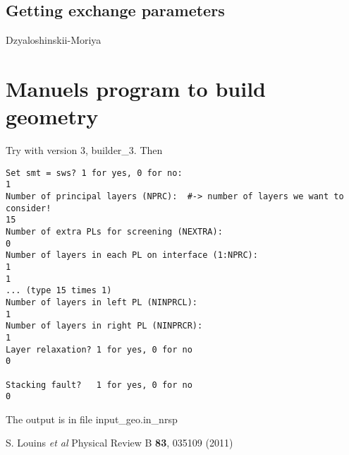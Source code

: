\documentclass[a4paper,10pt,fullpage]{report}
\begin{document}
\subsection*{Getting exchange parameters}


Dzyaloshinskii-Moriya


\newpage

\section{Manuels program to build geometry}
\label{sec:geometry}



Try with version 3, builder\_3. Then

\begin{verbatim}
Set smt = sws? 1 for yes, 0 for no:
1
Number of principal layers (NPRC):  #-> number of layers we want to consider!
15
Number of extra PLs for screening (NEXTRA):
0
Number of layers in each PL on interface (1:NPRC):
1
1
... (type 15 times 1)
Number of layers in left PL (NINPRCL):
1
Number of layers in right PL (NINPRCR):
1
Layer relaxation? 1 for yes, 0 for no
0

Stacking fault?   1 for yes, 0 for no
0
\end{verbatim}

The output is in file input\_geo.in\_nrsp

\begin{thebibliography}{99}

        
       S. Louins \textit{et al}
        Physical Review B \textbf{83}, 035109 (2011)       
        
        
        
\end{thebibliography}
\end{document}
